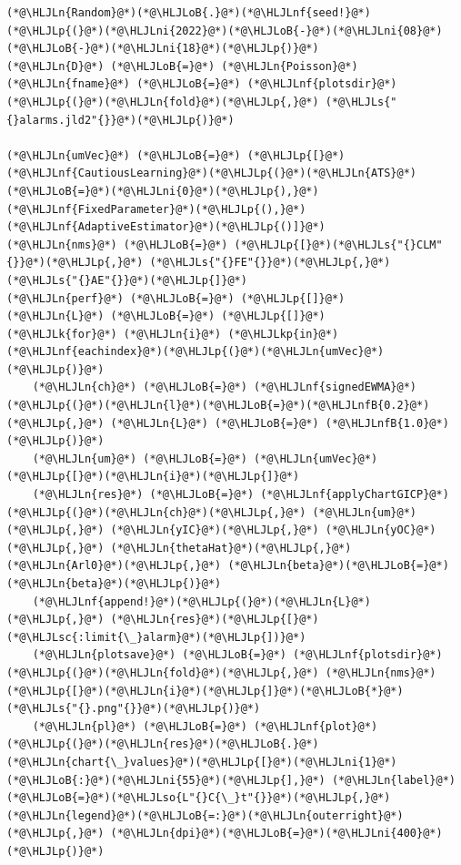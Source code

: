 \documentclass[12pt,a4paper]{article}
\newcommand{\HLJLk}[1]{\textcolor[RGB]{148,91,176}{\textbf{#1}}}
\newcommand{\HLJLkp}[1]{\textcolor[RGB]{148,91,176}{\textbf{#1}}}
\newcommand{\HLJLn}[1]{#1}
\newcommand{\HLJLnf}[1]{\textcolor[RGB]{66,102,213}{#1}}
\newcommand{\HLJLs}[1]{\textcolor[RGB]{201,61,57}{#1}}
\newcommand{\HLJLsc}[1]{\textcolor[RGB]{201,61,57}{#1}}
\newcommand{\HLJLso}[1]{\textcolor[RGB]{201,61,57}{#1}}
\newcommand{\HLJLnfB}[1]{\textcolor[RGB]{59,151,46}{#1}}
\newcommand{\HLJLni}[1]{\textcolor[RGB]{59,151,46}{#1}}
\newcommand{\HLJLoB}[1]{\textcolor[RGB]{102,102,102}{\textbf{#1}}}
\newcommand{\HLJLp}[1]{#1}
\begin{document}
\begin{lstlisting}
(*@\HLJLn{Random}@*)(*@\HLJLoB{.}@*)(*@\HLJLnf{seed!}@*)(*@\HLJLp{(}@*)(*@\HLJLni{2022}@*)(*@\HLJLoB{-}@*)(*@\HLJLni{08}@*)(*@\HLJLoB{-}@*)(*@\HLJLni{18}@*)(*@\HLJLp{)}@*)
(*@\HLJLn{D}@*) (*@\HLJLoB{=}@*) (*@\HLJLn{Poisson}@*)
(*@\HLJLn{fname}@*) (*@\HLJLoB{=}@*) (*@\HLJLnf{plotsdir}@*)(*@\HLJLp{(}@*)(*@\HLJLn{fold}@*)(*@\HLJLp{,}@*) (*@\HLJLs{"{}alarms.jld2"{}}@*)(*@\HLJLp{)}@*)

(*@\HLJLn{umVec}@*) (*@\HLJLoB{=}@*) (*@\HLJLp{[}@*)(*@\HLJLnf{CautiousLearning}@*)(*@\HLJLp{(}@*)(*@\HLJLn{ATS}@*)(*@\HLJLoB{=}@*)(*@\HLJLni{0}@*)(*@\HLJLp{),}@*) (*@\HLJLnf{FixedParameter}@*)(*@\HLJLp{(),}@*) (*@\HLJLnf{AdaptiveEstimator}@*)(*@\HLJLp{()]}@*)
(*@\HLJLn{nms}@*) (*@\HLJLoB{=}@*) (*@\HLJLp{[}@*)(*@\HLJLs{"{}CLM"{}}@*)(*@\HLJLp{,}@*) (*@\HLJLs{"{}FE"{}}@*)(*@\HLJLp{,}@*) (*@\HLJLs{"{}AE"{}}@*)(*@\HLJLp{]}@*)
(*@\HLJLn{perf}@*) (*@\HLJLoB{=}@*) (*@\HLJLp{[]}@*)
(*@\HLJLn{L}@*) (*@\HLJLoB{=}@*) (*@\HLJLp{[]}@*)
(*@\HLJLk{for}@*) (*@\HLJLn{i}@*) (*@\HLJLkp{in}@*) (*@\HLJLnf{eachindex}@*)(*@\HLJLp{(}@*)(*@\HLJLn{umVec}@*)(*@\HLJLp{)}@*)
    (*@\HLJLn{ch}@*) (*@\HLJLoB{=}@*) (*@\HLJLnf{signedEWMA}@*)(*@\HLJLp{(}@*)(*@\HLJLn{l}@*)(*@\HLJLoB{=}@*)(*@\HLJLnfB{0.2}@*)(*@\HLJLp{,}@*) (*@\HLJLn{L}@*) (*@\HLJLoB{=}@*) (*@\HLJLnfB{1.0}@*)(*@\HLJLp{)}@*)
    (*@\HLJLn{um}@*) (*@\HLJLoB{=}@*) (*@\HLJLn{umVec}@*)(*@\HLJLp{[}@*)(*@\HLJLn{i}@*)(*@\HLJLp{]}@*)
    (*@\HLJLn{res}@*) (*@\HLJLoB{=}@*) (*@\HLJLnf{applyChartGICP}@*)(*@\HLJLp{(}@*)(*@\HLJLn{ch}@*)(*@\HLJLp{,}@*) (*@\HLJLn{um}@*)(*@\HLJLp{,}@*) (*@\HLJLn{yIC}@*)(*@\HLJLp{,}@*) (*@\HLJLn{yOC}@*)(*@\HLJLp{,}@*) (*@\HLJLn{thetaHat}@*)(*@\HLJLp{,}@*) (*@\HLJLn{Arl0}@*)(*@\HLJLp{,}@*) (*@\HLJLn{beta}@*)(*@\HLJLoB{=}@*)(*@\HLJLn{beta}@*)(*@\HLJLp{)}@*)
    (*@\HLJLnf{append!}@*)(*@\HLJLp{(}@*)(*@\HLJLn{L}@*)(*@\HLJLp{,}@*) (*@\HLJLn{res}@*)(*@\HLJLp{[}@*)(*@\HLJLsc{:limit{\_}alarm}@*)(*@\HLJLp{])}@*)
    (*@\HLJLn{plotsave}@*) (*@\HLJLoB{=}@*) (*@\HLJLnf{plotsdir}@*)(*@\HLJLp{(}@*)(*@\HLJLn{fold}@*)(*@\HLJLp{,}@*) (*@\HLJLn{nms}@*)(*@\HLJLp{[}@*)(*@\HLJLn{i}@*)(*@\HLJLp{]}@*)(*@\HLJLoB{*}@*)(*@\HLJLs{"{}.png"{}}@*)(*@\HLJLp{)}@*)
    (*@\HLJLn{pl}@*) (*@\HLJLoB{=}@*) (*@\HLJLnf{plot}@*)(*@\HLJLp{(}@*)(*@\HLJLn{res}@*)(*@\HLJLoB{.}@*)(*@\HLJLn{chart{\_}values}@*)(*@\HLJLp{[}@*)(*@\HLJLni{1}@*)(*@\HLJLoB{:}@*)(*@\HLJLni{55}@*)(*@\HLJLp{],}@*) (*@\HLJLn{label}@*)(*@\HLJLoB{=}@*)(*@\HLJLso{L"{}C{\_}t"{}}@*)(*@\HLJLp{,}@*) (*@\HLJLn{legend}@*)(*@\HLJLoB{=:}@*)(*@\HLJLn{outerright}@*)(*@\HLJLp{,}@*) (*@\HLJLn{dpi}@*)(*@\HLJLoB{=}@*)(*@\HLJLni{400}@*)(*@\HLJLp{)}@*)

\end{lstlisting}
\end{document}

